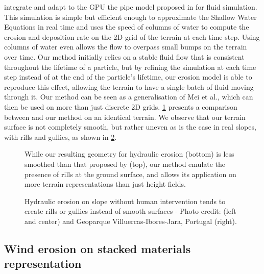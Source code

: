 \cite{Mei2007} integrate and adapt to the GPU the pipe model proposed in \cite{OBrien1995} for fluid simulation. This simulation is simple but efficient enough to approximate the Shallow Water Equations in real time and uses the speed of columns of water to compute the erosion and deposition rate on the 2D grid of the terrain at each time step. Using columns of water even allows the flow to overpass small bumps on the terrain over time. Our method initially relies on a stable fluid flow that is consistent throughout the lifetime of a particle, but by refining the simulation at each time step instead of at the end of the particle's lifetime, our erosion model is able to reproduce this effect, allowing the terrain to have a single batch of fluid moving through it. Our method can be seen as a generalisation of Mei et al., which can then be used on more than just discrete 2D grids. \cref{fig:erosion-screen-mei2007-1} presents a comparison between \cite{Mei2007} and our method on an identical terrain. We observe that our terrain surface is not completely smooth, but rather uneven as is the case in real slopes, with rills and gullies, as shown in \cref{fig:erosion-real-world-hydraulic}.

\begin{figure}[H]
    \caption[Comparison of hydraulic erosion with \cite{Mei2007}]{While our resulting geometry for hydraulic erosion (bottom) is less smoothed than that proposed by \cite{Mei2007} (top), our method emulate the presence of rills at the ground surface, and allows its application on more terrain representations than just height fields.}
    \label{fig:erosion-screen-mei2007-1}
\end{figure}
\begin{figure}[H]
    \caption[Real world examples of hydraulic erosions]{Hydraulic erosion on slope without human intervention tends to create rills or gullies instead of smooth surfaces - Photo credit: \cite{Ren2025} (left and center) and Geoparque Villuercas-Ibores-Jara, Portugal (right).}
    \label{fig:erosion-real-world-hydraulic}
\end{figure}

\subsection{Wind erosion on stacked materials representation}

